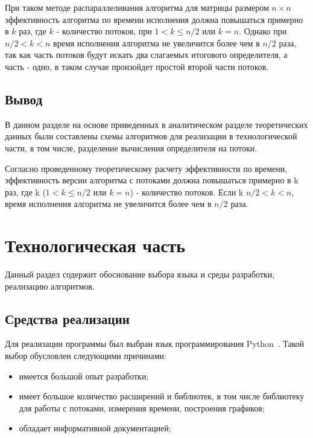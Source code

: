 \documentclass[a4paper,oneside,14pt]{extreport}
\begin{document}
При таком методе распараллеливания алгоритма для матрицы размером $n \times n$ эффективность
алгоритма по времени исполнения должна повышаться примерно в $k$ раз, где $k$ - количество потоков,
при $1 < k \leq n / 2$ или $k = n$.
Однако при $ n / 2 < k < n$ время исполнения алгоритма не увеличится более чем в $n / 2$ раза,
так как часть потоков будут искать два слагаемых итогового определителя, а часть - одно,
в таком случае произойдет простой второй части потоков.

\section{Вывод}
В данном разделе на основе приведенных в аналитическом разделе теоретических данных были составлены схемы алгоритмов для реализации в технологической части, в том числе, разделение вычисления определителя на потоки. 

Согласно проведенному теоретическому расчету эффективности по времени, эффективность версии алгоритма с потоками должна повышаться примерно в k раз, где k ($1 < k \leq n / 2$ или $k = n$) - количество потоков. Если k $ n / 2 < k < n$, время исполнения алгоритма не увеличится более чем в $n / 2$ раза.
\newpage

\chapter{Технологическая часть}
Данный раздел содержит обоснование выбора языка и среды разработки, реализацию алгоритмов.

\section{Средства реализации}
Для реализации программы был выбран язык программирования Python~\cite{python}. Такой выбор обусловлен следующими причинами:
\begin{itemize}
	\item имеется большой опыт разработки;
	\item имеет большое количество расширений и библиотек, в том числе библиотеку для работы с потоками, измерения времени, построения графиков;
	\item обладает информативной документацией;
\end{itemize}
\end{document}
